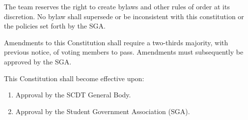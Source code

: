 \documentclass[12pt]{constitution}
\begin{document}
The team reserves the right to create bylaws and other rules of order at its
discretion. No bylaw shall supersede or be inconsistent with this constitution
or the policies set forth by the SGA.

\label{art:AMENDMENTS}

Amendments to this Constitution shall require a two-thirds majority, with
previous notice, of voting members to pass. Amendments must subsequently be
approved by the SGA. 

\label{art:ADOPTION}

This Constitution shall become effective upon: 

\begin{enumerate}
    \item Approval by the SCDT General Body.
    \item Approval by the Student Government Association (SGA). 
\end{enumerate}
\end{document}
